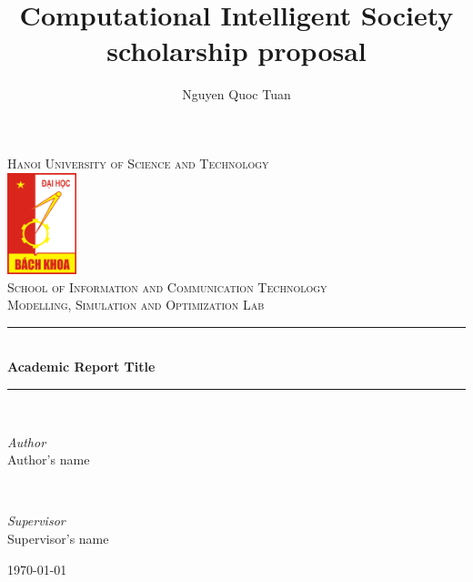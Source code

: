 \documentclass[10pt]{article}
\title{Computational Intelligent Society scholarship proposal}
\author{Nguyen Quoc Tuan}
\begin{document}
\begin{titlepage} %
	\newcommand{\HRule}{\rule{\linewidth}{0.5mm}} %
	
	\center %
	
	
	\textsc{\LARGE Hanoi University of Science and Technology}\\[1.5cm] %
	\includegraphics[width=2cm]{images/logohust.png}\\[5cm]
	
	\textsc{\Large School of Information and Communication Technology}\\[0.5cm] %
	
	\textsc{\large Modelling, Simulation and Optimization Lab}\\[0.5cm] %
	
	
	\HRule\\[0.4cm]
	
	{\huge\bfseries Academic Report Title}\\[0.4cm] %
	
	\HRule\\[1.5cm]
	
	
	\begin{minipage}{0.4\textwidth}
		\begin{flushleft}
			\large
			\textit{Author}\\
			Author's name
		\end{flushleft}
	\end{minipage}
	~
	\begin{minipage}{0.4\textwidth}
		\begin{flushright}
			\large
			\textit{Supervisor}\\
			Supervisor's name
		\end{flushright}
	\end{minipage}
	
	\vfill
	
	{\large\today} %
\end{titlepage}
\end{document}
